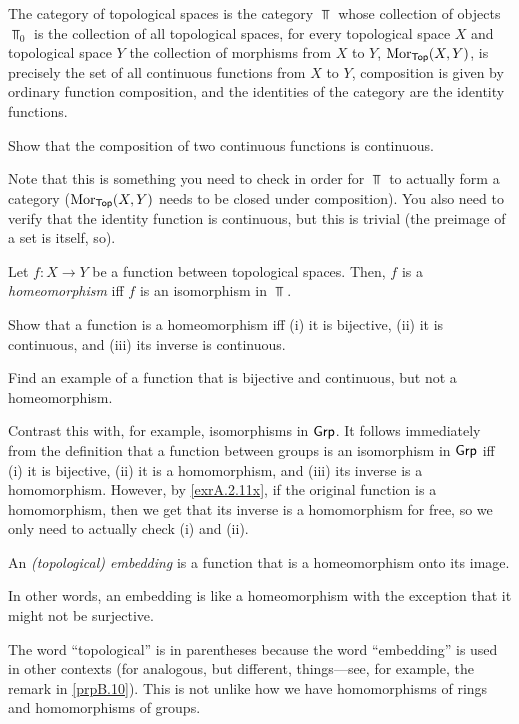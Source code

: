 \begin{exm}
The category of topological spaces is the category $\Top$\index[notation]{$\Top$} whose collection of objects $\Top _0$ is the collection of all topological spaces, for every topological space $X$ and topological space $Y$ the collection of morphisms from $X$ to $Y$, $\operatorname{Mor} _{\mathsf{Top}}(X,Y)$, is precisely the set of all continuous functions from $X$ to $Y$, composition is given by ordinary function composition, and the identities of the category are the identity functions.
\begin{exr}
Show that the composition of two continuous functions is continuous.
\begin{rmk}
Note that this is something you need to check in order for $\Top$ to actually form a category ($\operatorname{Mor} _{\mathsf{Top}}(X,Y)$ needs to be closed under composition).  You also need to verify that the identity function is continuous, but this is trivial (the preimage of a set is itself, so\textellipsis ).
\end{rmk}
\end{exr}
\end{exm}
\begin{dfn}[Homeomorphism]\label{Homeomorphism}
Let $f:X\rightarrow Y$ be a function between topological spaces.  Then, $f$ is a \emph{homeomorphism} iff $f$ is an isomorphism in $\Top$.
\end{dfn}
\begin{exr}
Show that a function is a homeomorphism iff (i) it is bijective, (ii) it is continuous, and (iii) its inverse is continuous.
\end{exr}
\begin{exr}
Find an example of a function that is bijective and continuous, but not a homeomorphism.
\begin{rmk}
Contrast this with, for example, isomorphisms in $\mathsf{Grp}$.  It follows immediately from the definition that a function between groups is an isomorphism in $\mathsf{Grp}$ iff (i) it is bijective, (ii) it is a homomorphism, and (iii) its inverse is a homomorphism.  However, by \cref{exrA.2.11x}, if the original function is a homomorphism, then we get that its inverse is a homomorphism for free, so we only need to actually check (i) and (ii).
\end{rmk}
\end{exr}
\begin{dfn}[Embedding]\label{Embedding}
An \emph{(topological) embedding} is a function that is a homeomorphism onto its image.
\begin{rmk}
In other words, an embedding is like a homeomorphism with the exception that it might not be surjective.
\end{rmk}
\begin{rmk}
The word ``topological'' is in parentheses because the word ``embedding'' is used in other contexts (for analogous, but different, things---see, for example, the remark in \cref{prpB.10}).  This is not unlike how we have homomorphisms of rings and homomorphisms of groups.
\end{rmk}
\end{dfn}
